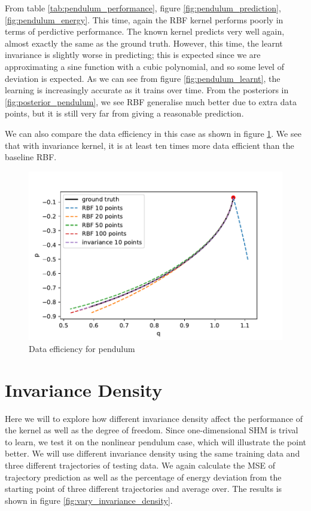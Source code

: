 \documentclass{statsmsc}
\begin{document}
From table \ref{tab:pendulum_performance}, figure \ref{fig:pendulum_prediction}, \ref{fig:pendulum_energy}.
This time, again the RBF kernel performs poorly in terms of perdictive performance.
The known kernel predicts very well again, almost exactly the same as the ground truth.
However, this time, the learnt invariance is slightly worse in predicting; this is expected since we are approximating a sine function with a cubic polynomial, and so some level of deviation is expected.
As we can see from figure \ref{fig:pendulum_learnt}, the learning is increasingly accurate as it trains over time.
From the posteriors in \ref{fig:posterior_pendulum}, we see RBF generalise much better due to extra data points, but it is still very far from giving a reasonable prediction. 

We can also compare the data efficiency in this case as shown in figure \ref{fig:data_efficiency}. 
We see that with invariance kernel, it is at least ten times more data efficient than the baseline RBF.

\begin{figure}[H] 
  \includegraphics[width=0.8\linewidth]{../codes/figures/data_efficiency.pdf}
  \centering
  \caption{Data efficiency for pendulum}
  \label{fig:data_efficiency}
\end{figure}

\section{Invariance Density}
Here we will to explore how different invariance density affect the performance of the kernel as well as the degree of freedom.
Since one-dimensional SHM is trival to learn, we test it on the nonlinear pendulum case, which will illustrate the point better. 
We will use different invariance density using the same training data and three different trajectories of testing data.
We again calculate the MSE of trajectory prediction as well as the percentage of energy deviation from the starting point of three different trajectories and average over.
The results is shown in figure \ref{fig:vary_invariance_density}.
\end{document}
